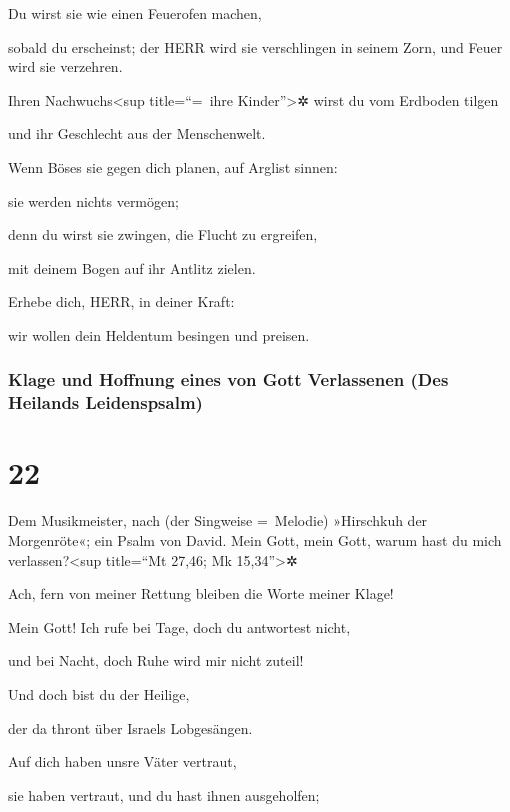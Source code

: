 Du wirst sie wie einen Feuerofen machen,

sobald du erscheinst; der HERR wird sie verschlingen in seinem Zorn, und
Feuer wird sie verzehren.

Ihren Nachwuchs\textless sup title=``=~ihre
Kinder''\textgreater✲ wirst du vom Erdboden tilgen

und ihr Geschlecht aus der Menschenwelt.

Wenn Böses sie gegen dich planen, auf Arglist sinnen:

sie werden nichts vermögen;

denn du wirst sie zwingen, die Flucht zu ergreifen,

mit deinem Bogen auf ihr Antlitz zielen.

Erhebe dich, HERR, in deiner Kraft:

wir wollen dein Heldentum besingen und preisen.

\hypertarget{klage-und-hoffnung-eines-von-gott-verlassenen-des-heilands-leidenspsalm}{%
\subsubsection{Klage und Hoffnung eines von Gott Verlassenen (Des
Heilands
Leidenspsalm)}\label{klage-und-hoffnung-eines-von-gott-verlassenen-des-heilands-leidenspsalm}}

\hypertarget{section-21}{%
\section{22}\label{section-21}}

Dem Musikmeister, nach (der Singweise =~Melodie)
»Hirschkuh der Morgenröte«; ein Psalm von David. Mein
Gott, mein Gott, warum hast du mich verlassen?\textless sup title=``Mt
27,46; Mk 15,34''\textgreater✲

Ach, fern von meiner Rettung bleiben die Worte meiner Klage!

Mein Gott! Ich rufe bei Tage, doch du antwortest nicht,

und bei Nacht, doch Ruhe wird mir nicht zuteil!

Und doch bist du der Heilige,

der da thront über Israels Lobgesängen.

Auf dich haben unsre Väter vertraut,

sie haben vertraut, und du hast ihnen ausgeholfen;

